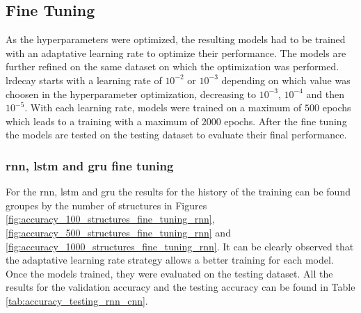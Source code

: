 \documentclass[conference]{IEEEtran}
\begin{document}
\subsection{Fine Tuning}
\label{sec:fine_tuning_results}

As the hyperparameters were optimized, the resulting models had to be trained with an adaptative learning rate to optimize their performance. The models are further refined on the same dataset on which the optimization was performed. \gls{lrdecay} starts with a learning rate of $10^{-2}$ or $10^{-3}$ depending on which value was choosen in the hyperparameter optimization, decreasing to $10^{-3}$, $10^{-4}$ and then $10^{-5}$. With each learning rate, models were trained on a maximum of $ 500 $ epochs which leads to a training with a maximum of $ 2 000 $ epochs. After the fine tuning the models are tested on the testing dataset to evaluate their final performance.

\subsubsection{\gls{rnn}, \gls{lstm} and \gls{gru} fine tuning}
\label{sec:rnn_fine_tuning_results}

For the \gls{rnn}, \gls{lstm} and \gls{gru} the results for the history of the training can be found groupes by the number of structures in Figures \ref{fig:accuracy_100_structures_fine_tuning_rnn}, \ref{fig:accuracy_500_structures_fine_tuning_rnn} and \ref{fig:accuracy_1000_structures_fine_tuning_rnn}. It can be clearly observed that the adaptative learning rate strategy allows a better training for each model. Once the models trained, they were evaluated on the testing dataset. All the results for the validation accuracy and the testing accuracy can be found in Table \ref{tab:accuracy_testing_rnn_cnn}.  
\end{document}

